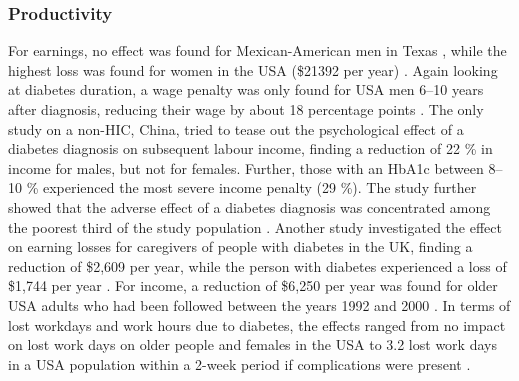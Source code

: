 \documentclass[12pt,english]{article}
\begin{document}
\subsubsection{Productivity}
For earnings, no effect was found for Mexican-American men in Texas \parencite{Bastida2002}, while the highest loss was found for women in the USA (\$21392 per year) \parencite{Minor2011a}. Again looking at diabetes duration, a wage penalty was only found for USA men 6--10 years after diagnosis, reducing their wage by about 18 percentage points \parencite{Minor2013}. The only study on a non-\ac{HIC}, China, tried to tease out the psychological effect of a diabetes diagnosis on subsequent labour income, finding a reduction of 22 \% in income for males, but not for females. Further, those with an \ac{HbA1c} between 8--10 \% experienced the most severe income penalty (29 \%). The study further showed that the adverse effect of a diabetes diagnosis was concentrated among the poorest third of the study population \parencite{Liu2014}. Another study investigated the effect on earning losses for caregivers of people with diabetes in the \ac{UK}, finding a reduction of \$2,609 per year, while the person with diabetes experienced a loss of \$1,744 per year \parencite{Holmes2003a}. For income, a reduction of \$6,250 per year was found for older USA adults who had been followed between the years 1992 and 2000 \parencite{Vijan2004b}. In terms of lost workdays and work hours due to diabetes, the effects ranged from no impact on lost work days on older people \parencite{Vijan2004b} and females in the USA \parencite{Minor2011a} to 3.2 lost work days in a USA population within a 2-week period if complications were present \parencite{Ng2001b}.
\end{document}
